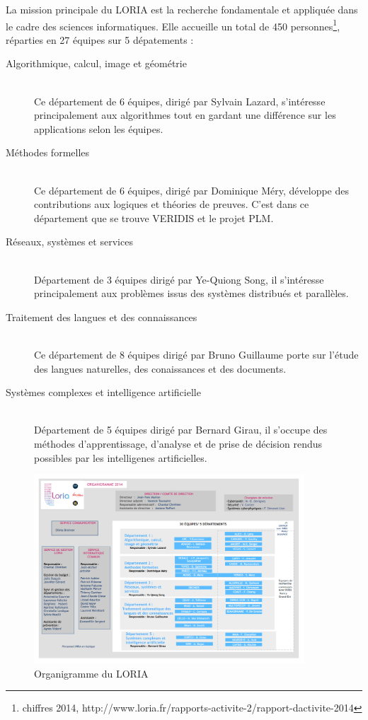 \documentclass[stage]{tnreport}
\begin{document}
La mission principale du LORIA est la recherche fondamentale et appliquée dans le cadre des sciences informatiques. Elle accueille un total de 450 personnes\footnote{chiffres 2014, http://www.loria.fr/rapports-activite-2/rapport-dactivite-2014}, réparties en 27 équipes sur 5 dépatements :
\begin{description}
	\item[Algorithmique, calcul, image et géométrie] \hfill \\
		Ce département de 6 équipes, dirigé par Sylvain Lazard, s'intéresse principalement aux algorithmes tout en gardant une différence sur les applications selon les équipes.
	\item[Méthodes formelles] \hfill \\
		 Ce département de 6 équipes, dirigé par Dominique Méry, développe des contributions aux logiques et théories de preuves. C'est dans ce département que se trouve VERIDIS et le projet PLM.
	\item[Réseaux, systèmes et services] \hfill \\
		 Département de 3 équipes dirigé par Ye-Quiong Song, il s'intéresse principalement aux problèmes issus des systèmes distribués et parallèles.
	\item[Traitement des langues et des connaissances] \hfill \\
		 Ce département de 8 équipes dirigé par Bruno Guillaume porte sur l'étude des langues naturelles, des conaissances et des documents.
	\item[Systèmes complexes et intelligence artificielle] \hfill \\
		 Département de 5 équipes dirigé par Bernard Girau, il s'occupe des méthodes d'apprentissage, d'analyse et de prise de décision rendus possibles par les intelligenes artificielles.
\end{description}

\clearpage

\begin{figure}[h]
	\centering
		\includegraphics[width=0.9\textwidth]{figures/LORIA-organigramme}
	\caption{Organigramme du LORIA}
	\label{fig:organigramme}
\end{figure}
\end{document}
